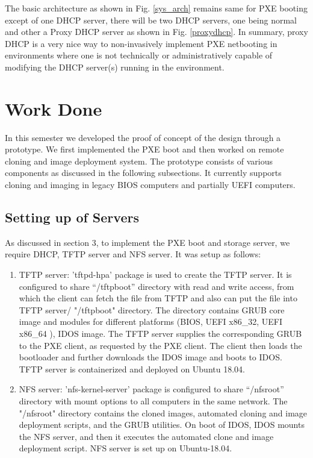 \documentclass[a4paper,12pt]{article}
\begin{document}
The basic architecture as shown in Fig. \ref{sys_arch} remains same for PXE booting except of one DHCP server, there will be two DHCP servers, one being normal and other a Proxy DHCP server as shown in Fig. \ref{proxydhcp}. In summary, proxy DHCP is a very nice way to non-invasively implement PXE netbooting in environments where one is not technically or administratively capable of modifying the DHCP server(s) running in the environment.
    


\newpage
\section{\fontsize{16pt}{1em} Work Done}
In this semester we developed the proof of concept of the design through a prototype. We first implemented the PXE boot and then worked on remote cloning and image deployment system. The prototype consists of various components as discussed in the following subsections. It currently supports cloning and imaging in legacy BIOS computers and partially UEFI computers. 
\subsection{ Setting up of Servers}
As discussed in section 3, to implement the PXE boot and storage server, we require DHCP, TFTP server and NFS server. It was setup as follows:
\begin{enumerate}
    \item TFTP server: 'tftpd-hpa' package is used to create the TFTP server. It is configured to share  “/tftpboot” directory with read and write access, from which the client can fetch the file from TFTP and also can put the file into TFTP server/ "/tftpboot" directory. The directory contains  GRUB core image and modules for different platforms (BIOS,  UEFI x86\_32, UEFI x86\_64 ), IDOS image. The TFTP server supplies the corresponding GRUB to the PXE client, as requested by the PXE client. The client then loads the bootloader and further downloads the IDOS image and boots to IDOS. TFTP server is containerized and deployed on Ubuntu 18.04.
    \item  NFS server: 'nfs-kernel-server' package is configured to share “/nfsroot” directory with mount options to all computers in the same network. The "/nfsroot" directory contains the cloned images, automated cloning and image deployment scripts, and the GRUB utilities. On boot of IDOS, IDOS mounts the NFS server, and then it executes the automated clone and image deployment script. NFS server is set up on Ubuntu-18.04. 
\end{enumerate}
\end{document}
